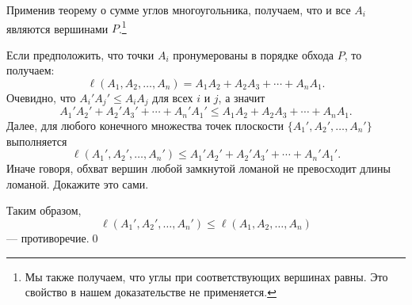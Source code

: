 \documentclass{article}
\begin{document}
Применив теорему о сумме углов многоугольника, получаем, что и все $A_i$ являются вершинами $P$.\footnote{Мы также получаем, что углы при соответствующих вершинах равны. Это свойство в нашем доказательстве не применяется.}

Если предположить, что точки $A_i$ пронумерованы в порядке обхода $P$, то получаем:
$$\ell(A_1,A_2,\dots,A_{n})=A_1A_2+A_2A_3+\cdots+A_nA_1.$$
Очевидно, что $A_i'A_j'\le A_iA_j$ для всех $i$ и $j$, а значит
$$A_1'A_2'+A_2'A_3'+\cdots+A_n'A_1'\le A_1A_2+A_2A_3+\cdots+A_nA_1.$$
Далее, для любого конечного множества точек плоскости $\{A_1',A_2',\dots,A_{n}'\}$ выполняется
$$\ell(A_1',A_2',\dots,A_{n}')\le A_1'A_2'+A_2'A_3'+\cdots+A_n'A_1'.$$
Иначе говоря, обхват вершин любой замкнутой ломаной не превосходит длины ломаной.
Докажите это сами. 

Таким образом,
$$\ell(A_1',A_2',\dots,A_{n}')\le\ell(A_1,A_2,\dots,A_{n})$$
--- противоречие.\qed
\end{document}
